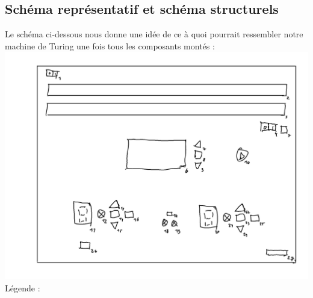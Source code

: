 \documentclass[12pt]{report}
\begin{document}
	\subsection{Schéma représentatif et schéma structurels}
	Le schéma ci-dessous nous donne une idée de ce à quoi pourrait ressembler notre machine de Turing une fois tous les composants montés :\\
	\includegraphics[width=\textwidth]{img/rep_machine}
	\\
	Légende :\\
\end{document}
